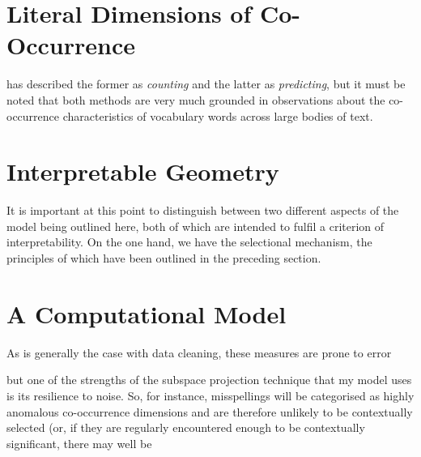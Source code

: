 \section{Literal Dimensions of Co-Occurrence}
\cite{Baroni} has described the former as \emph{counting} and the latter as \emph{predicting}, but it must be noted that both methods are very much grounded in observations about the co-occurrence characteristics of vocabulary words across large bodies of text.

\section{Interpretable Geometry}
It is important at this point to distinguish between two different aspects of the model being outlined here, both of which are intended to fulfil a criterion of interpretability.  On the one hand, we have the selectional mechanism, the principles of which have been outlined in the preceding section.

\section{A Computational Model}

As is generally the case with data cleaning, these measures are prone to error

but one of the strengths of the subspace projection technique that my model uses is its resilience to noise.  So, for instance, misspellings will be categorised as highly anomalous co-occurrence dimensions and are therefore unlikely to be contextually selected (or, if they are regularly encountered enough to be contextually significant, there may well be 